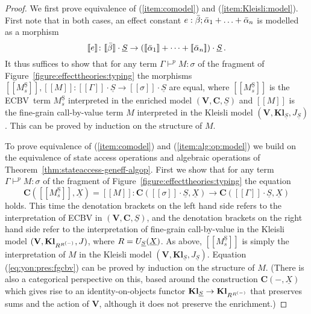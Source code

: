 \documentclass{LMCS}
\newcommand{\pj}[3]{#1 \mathrel{\vdash^p} #2 \colon \! #3}
\newcommand{\STA}{\sigma}
\newcommand{\EECstate}{\underline{\mathrm{S}}}
\newcommand{\svar}s
\newcommand{\comptype}[1]{\underline{#1}}
\newcommand{\co}{\colon}
\newcommand{\algX}{{\comptype{X}}}
\newcommand{\ECBV}{ECBV}
\newcommand{\CBVtoEEC}[1]{#1^{\circ}}
\newcommand{\CBVtoEECbase}[2]{#2^{#1}}
\renewcommand{\vec}[1]{\bar{#1}}
\newcommand{\VCat}{\fixedcatfont{V}} \newcommand{\CCat}{\fixedcatfont{C}} \newcommand{\DCat}{\fixedcatfont{D}}
\newcommand{\ltensor}[2]{#1 \cdot #2}
\newcommand{\fixedcatfont}{\mathbf}
\newcommand{\denlb}{[\![}
\newcommand{\denrb}{]\!]}
\newcommand{\den}[1]{\denlb{#1}\denrb}
\newcommand{\stateobj}{{\underline{S}}}
\newcommand{\KlCat}[3]{\mathbf{Kl}_{#3}} \newcommand{\Klltensor}[2]{#1 \cdot_{\mathbf{Kl}} #2}
\begin{document}
\renewcommand{\CBVtoEEC}{\CBVtoEECbase\EECstate}
\renewcommand{\CBVtoEECV}{\CBVtoEECbase \EECstate}
\renewcommand{\CBVtoEECP}[1]{\CBVtoEECbase \EECstate{#1}_\svar}
\begin{proof}
We first prove equivalence of (\ref{item:comodel}) and (\ref{item:Kleisli:model}). First note that in both 
cases, an effect constant 
$\arityj{\geff}{\vec\beta}{\vec \alpha_1 + \ldots + \vec \alpha_n}$ is modelled as a morphism
\[
\den\geff\colon \ltensor{\den{\vec\beta}}{\stateobj} \to \ltensor{(\den{\vec\alpha_1}+\dots+\den{\vec\alpha_n})}{\stateobj} \,.
\]
It thus suffices to show that for any term 
$\pj{\Gamma}{M}{\STA}$ of the fragment
of Figure~\ref{figure:effecttheories:typing} 
the morphisms $\den{\CBVtoEECP{M}}, \den{M}:\ltensor{\den\Gamma}\stateobj
\to \ltensor{\den \STA}\stateobj$ are equal, where $\den{\CBVtoEECP{M}}$
is the \ECBV\ term $\CBVtoEECP{M}$ interpreted 
in the enriched model $(\VCat, \CCat, \stateobj)$ and $\den{M}$ is
the fine-grain call-by-value term $M$ interpreted in the Kleisli model $(\VCat, \KlCat{\VCat}{\CCat}{\stateobj}, J_{\stateobj})$. This can be
proved by induction on the structure of $M$.

To prove equivalence of (\ref{item:comodel}) and (\ref{item:alg:op:model}) we build on the equivalence of 
state access operations and algebraic operations of Theorem~\ref{thm:stateaccess-geneff-algop}. First we show that
for any term $\pj{\Gamma}{M}{\STA}$ of the fragment
of Figure~\ref{figure:effecttheories:typing} the equation 
\begin{equation} \label{eq:yon:pres:fgcbv}
\CCat(\den{\CBVtoEECP{M}},\algX) = \den{M} \co \CCat(\ltensor{\den\STA}{\stateobj},\algX) \to \CCat(\ltensor{\den\Gamma}{\stateobj},\algX)
\end{equation}
holds. This time the denotation brackets on the left hand side refers to the interpretation of ECBV in 
$(\VCat, \CCat, \stateobj)$, and 
the denotation brackets on the right hand side refer to the interpretation of fine-grain call-by-value in the Kleisli model 
$(\VCat, \KlCat{\VCat}{\CCat}{\retVobj^{\retVobj^{(-)}}}, J)$, where ${\retVobj=U_\stateobj(\algX)}$. As above, $\den{\CBVtoEECP{M}}$ is simply the interpretation  
of $M$ in the Kleisli model $(\VCat, \KlCat{\VCat}{\CCat}{\stateobj}, J_{\stateobj})$. 
Equation (\ref{eq:yon:pres:fgcbv}) can be proved by induction on the structure of $M$. 
(There is also a categorical perspective on this, based around the construction
$\CCat(-,\algX)$ which gives rise to
an identity-on-objects functor
$\KlCat{\VCat}{\CCat}{\stateobj}\to\KlCat{\VCat}{\CCat}{\retVobj^{\retVobj^{(-)}}}$
that preserves sums and the action of $\VCat$, although it does not preserve 
the enrichment.)





\end{proof}
\end{document}
